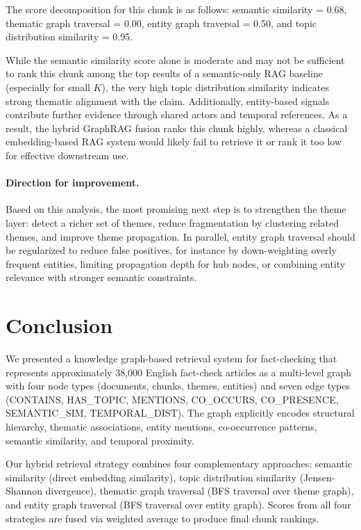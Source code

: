 \documentclass[10pt]{article}
\begin{document}
The score decomposition for this chunk is as follows: semantic similarity = 0.68, thematic graph traversal = 0.00, entity graph traversal = 0.50, and topic distribution similarity = 0.95.

While the semantic similarity score alone is moderate and may not be sufficient to rank this chunk among the top results of a semantic-only RAG baseline (especially for small $K$), the very high topic distribution similarity indicates strong thematic alignment with the claim. Additionally, entity-based signals contribute further evidence through shared actors and temporal references. As a result, the hybrid GraphRAG fusion ranks this chunk highly, whereas a classical embedding-based RAG system would likely fail to retrieve it or rank it too low for effective downstream use.


\paragraph{Direction for improvement.}
Based on this analysis, the most promising next step is to strengthen the theme layer: detect a richer set of themes, reduce fragmentation by clustering related themes, and improve theme propagation. In parallel, entity graph traversal should be regularized to reduce false positives, for instance by down-weighting overly frequent entities, limiting propagation depth for hub nodes, or combining entity relevance with stronger semantic constraints.

\section{Conclusion}
\label{sec:conclusion}

We presented a knowledge graph-based retrieval system for fact-checking that represents approximately 38,000 English fact-check articles as a multi-level graph with four node types (documents, chunks, themes, entities) and seven edge types (CONTAINS, HAS\_TOPIC, MENTIONS, CO\_OCCURS, CO\_PRESENCE, SEMANTIC\_SIM, TEMPORAL\_DIST). The graph explicitly encodes structural hierarchy, thematic associations, entity mentions, co-occurrence patterns, semantic similarity, and temporal proximity.

Our hybrid retrieval strategy combines four complementary approaches: semantic similarity (direct embedding similarity), topic distribution similarity (Jensen-Shannon divergence), thematic graph traversal (BFS traversal over theme graph), and entity graph traversal (BFS traversal over entity graph). Scores from all four strategies are fused via weighted average to produce final chunk rankings.
\end{document}
